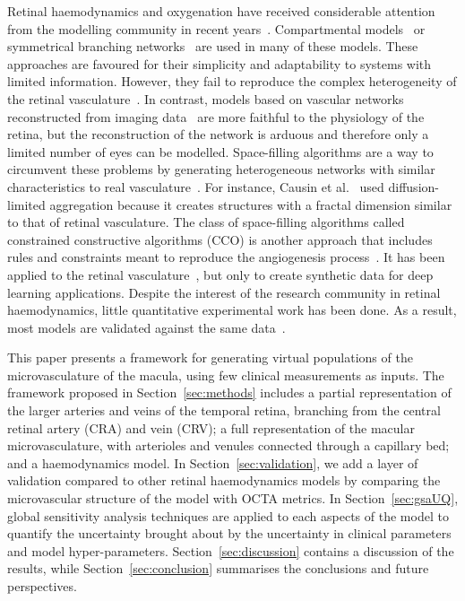 \documentclass[11pt,]{article}
\begin{document}
Retinal haemodynamics and oxygenation have received considerable
attention from the modelling community in recent
years~\cite{Arciero2008,Bernabeu2014,Causin2016,Chiaravalli2022,DoblhoffDier2014,
  Fry2020,Guidoboni2014,Hernandez2023,Takahashi2009,Zhu2019,Yu2019}.
Compartmental models~\cite{Arciero2008,Guidoboni2014,Chiaravalli2022}
or symmetrical branching
networks~\cite{Chiaravalli2022,Takahashi2009,Zhu2019} are used in many
of these models. These approaches are favoured for their simplicity
and adaptability to systems with limited information. However, they
fail to reproduce the complex heterogeneity of the retinal
vasculature~\cite{Yu2019}. In contrast, models based on vascular
networks reconstructed from imaging data~\cite{Bernabeu2014,Fry2020}
are more faithful to the physiology of the retina, but the
reconstruction of the network is arduous and therefore only a limited
number of eyes can be modelled. Space-filling algorithms are a way to
circumvent these problems by generating heterogeneous networks with
similar characteristics to real
vasculature~\cite{Causin2016,Linninger2013,Talou2021}. For instance,
Causin et al.~\cite{Causin2016} used diffusion-limited aggregation because it creates structures with a fractal dimension similar to that of retinal vasculature.
The class of space-filling algorithms called constrained constructive algorithms
(CCO) is another approach that includes rules and constraints meant to
reproduce the angiogenesis process~\cite{Linninger2013,Talou2021}. It
has been applied to the retinal
vasculature~\cite{Brown2023,LoCastro2020}, but only to create
synthetic data for deep learning applications. Despite the interest of
the research community in retinal haemodynamics, little quantitative
experimental work has been done. As a result, most models are
validated against the same data~\cite{DoblhoffDier2014,Riva1985}.

This paper presents a framework for generating virtual populations of
the microvasculature of the macula, using few clinical measurements as
inputs. The framework proposed in Section~\ref{sec:methods} includes a
partial representation of the larger arteries and veins of the
temporal retina, branching from the central retinal artery (CRA) and
vein (CRV); a full representation of the macular microvasculature,
with arterioles and venules connected through a capillary bed; and a
haemodynamics model. In Section~\ref{sec:validation}, we add a layer
of validation compared to other retinal haemodynamics models by
comparing the microvascular structure of the model with OCTA
metrics. In Section~\ref{sec:gsaUQ}, global sensitivity analysis
techniques are applied to each aspects of the model to
quantify the uncertainty brought about by the uncertainty in clinical
parameters and model hyper-parameters. Section~\ref{sec:discussion}
contains a discussion of the results, while
Section~\ref{sec:conclusion} summarises the conclusions and future
perspectives.
\end{document}
